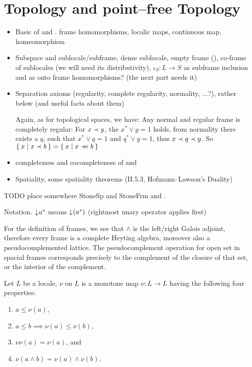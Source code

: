 \section{Topology and point--free Topology}
\begin{itemize}
    \item Basic of \Top{} and \Frm. frame homomorphisms, localic maps, continuous map, homeomorphism
    \item Subspace and sublocale/subframe, dense sublocale, empty frame (\emptyFrm), co-frame of sublocales (we will need its distributivity), $\iota_S\colon L \to S$ as subframe inclusion and as onto frame homomorphisms? (the next part needs it)
    \item Separation axioms (regularity, complete regularity, normality, ...?), rather below (and useful facts about them)

    Again, as for topological spaces, we have: Any normal and regular frame is completely regular: For $x\prec y$, the $x^*\vee y = 1$ holds, from normality there exists a $q$, such that $x^*\vee q = 1$ and $q^*\vee y = 1$, thus $x\prec q\prec y$. So $\Set{x | x\prec b} = \Set{x | x\prec\mkern-7mu\prec b}$
    \item completeness and cocompleteness of \Top{} and \Frm{}
    \item Spatiality, some spatiality theorems (II.5.3, Hofmann--Lawson's Duality)
\end{itemize}

TODO place somewhere StoneSp and StoneFrm and \J.

Notation.
$\mathord{\downarrow}\mkern1mu a^*$ means $\mathord{\downarrow}\mkern1mu (a^*)$ (rightmost unary operator applies first)

For the definition of frames, we see that $\wedge$ is the left/right Galois adjoint, therefore every frame is a complete Heyting algebra, moreover also a pseudocomplemented lattice. The pseudocomplement operation for open set in spacial frames corresponds precisely to the complement of the closure of that set, or the interior of the complement.

\begin{definition}
    Let $L$ be a locale,  $\nu$ on $L$ is a monotone map $\nu\colon L \to L$ having the following four properties:
    \begin{enumerate}[(N1)]
        \item $a \leq \nu(a)$,
        \item $a \leq b \implies \nu(a) \leq \nu(b)$,
        \item $\nu\nu(a) = \nu(a)$, and
        \item $\nu(a \wedge b) = \nu(a) \wedge \nu(b)$.
    \end{enumerate}
\end{definition}

